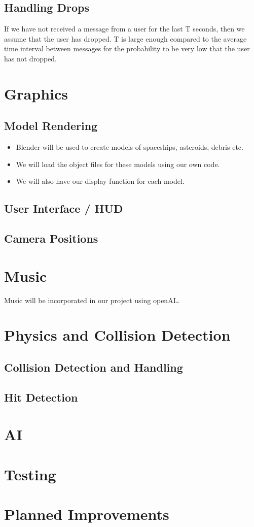 \documentclass[]{article}
\begin{document}
\subsection{Handling Drops}
If we have not received a message from a user for the last T seconds, then we assume that the user has dropped. T is large enough compared to the average time interval between messages for the probability to be very low that the user has not dropped.
\section{Graphics}
\subsection{Model Rendering}
\begin{itemize}
\item Blender will be used to create models of spaceships, asteroids, debris etc.
\item We will load the object files for these models using our own code.
\item We will also have our display function for each model.
\end{itemize}
\subsection{User Interface / HUD}
\subsection{Camera Positions}
\section{Music}
Music will be incorporated in our project using openAL.
\section{Physics and Collision Detection}
\subsection{Collision Detection and Handling}
\subsection{Hit Detection}
\section{AI}
\section{Testing}
\section{Planned Improvements}
\end{document}
